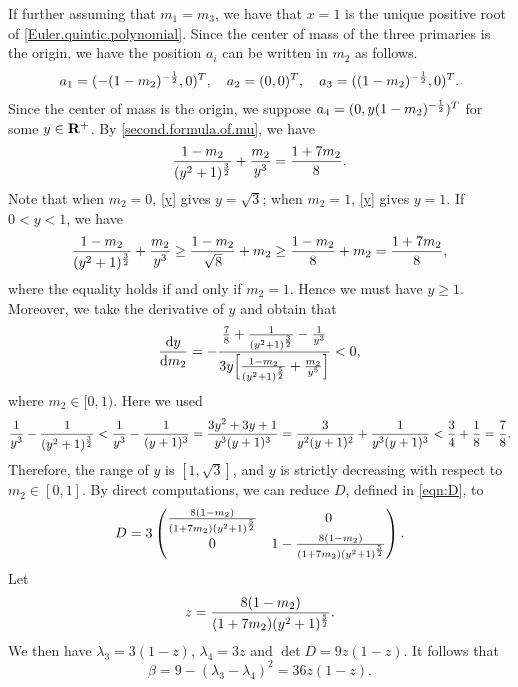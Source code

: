 \documentclass[11pt]{article}
\def\d{{\mathrm{d}}}
\def\R{{\bf R}}
\begin{document}
If further assuming that $m_1 = m_3$, we have that $x=1$ is the unique positive root of \eqref{Euler.quintic.polynomial}.
Since the center of mass of the three primaries is the origin, we have the position $a_i$ can be written in $m_2$ as follows.
\begin{align}
a_1 = (-(1-m_2)^{-{1\over2}},0)^T,\quad 
a_2 = (0,0)^T,\quad 
a_3 = ((1-m_2)^{-{1\over2}},0)^T.
\end{align}
Since the center of mass is the origin,
we suppose $a_4=(0,y(1-m_2)^{-{1\over2}})^T$ for some $y\in\R^+$.
By \eqref{second.formula.of.mu}, we have
\begin{equation}\label{y}
{1-m_2\over(y^2+1)^{3\over2}} + {m_2\over y^3}={1+7m_2\over8}.
\end{equation}
Note that when $m_2=0$, \eqref{y} gives $y=\sqrt{3}$;
when $m_2=1$, \eqref{y} gives $y=1$.
If $0<y<1$, we have
\begin{equation}
{1-m_2\over(y^2+1)^{3\over2}} + {m_2\over y^3}\ge{1-m_2\over\sqrt{8}}+m_2\ge{1-m_2\over8}+m_2={1+7m_2\over8},
\end{equation}
where the equality holds if and only if $m_2=1$.
Hence we must have $y\ge1$.
Moreover, we take the derivative of $y$ and obtain that 
\begin{equation}\label{y.prime}
{\d y\over \d m_2}
=-\frac{{7\over8}+{1\over(y^2+1)^{3\over2}}-{1\over y^3}}
       {3y\Big[{1-m_2\over(y^2+1)^{5\over2}} + {m_2\over y^5}\Big]}
       <0,
\end{equation}
where $m_2\in[0,1)$.
Here we used
$$
{1\over y^3}-{1\over(y^2+1)^{3\over2}}<{1\over y^3}-{1\over (y+1)^3}
={3y^2+3y+1\over y^3(y+1)^3}={3\over y^2(y+1)^2}+{1\over y^3(y+1)^3}
<{3\over4}+{1\over8}={7\over8}.
$$
Therefore, the range of $y$ is $[1,\sqrt{3}]$,
and $y$ is strictly decreasing with respect to $m_2\in[0,1]$.
By direct computations,  we can reduce $D$, defined in \eqref{eqn:D}, to 
\begin{equation}
D=3\left(\begin{matrix}
{8(1-m_2)\over(1+7m_2)(y^2+1)^{5\over2}} & 0\\
0 & 1 - {8(1-m_2)\over(1+7m_2)(y^2+1)^{5\over2}}
\end{matrix}\right).
\end{equation}
Let
\begin{equation}\label{z}
z = {8(1-m_2)\over(1+7m_2)(y^2+1)^{5\over2}}.
\end{equation}
We then have $\lambda_3=3(1-z)$, $\lambda_4=3z$ and $\det D=9z(1-z)$. It follows that 
\begin{equation}\label{beta}
\beta = 9-(\lambda_3-\lambda_4)^2=36z(1-z).
\end{equation}
\end{document}
